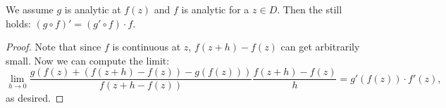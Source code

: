 \documentclass[notes]{subfile}
\begin{document}
\begin{theorem}
    We assume $g$ is analytic at $f(z)$ and $f$ is analytic for a $z \in D$.
    Then the  still holds: $(g \circ f)' = (g' \circ f) \cdot f$.
\end{theorem}

\begin{proof}
    Note that since $f$ is continuous at $z$, $f(z+h) - f(z)$ can get arbitrarily small.
    Now we can compute the limit:
    \[ \lim_{h \to 0} \frac{g(f(z) + (f(z+h) - f(z)) - g(f(z)))}{f(z+h - f(z))}
    \frac{f(z+h) - f(z)}{h} = g'(f(z)) \cdot f'(z), \]
    as desired.
\end{proof}
\end{document}
